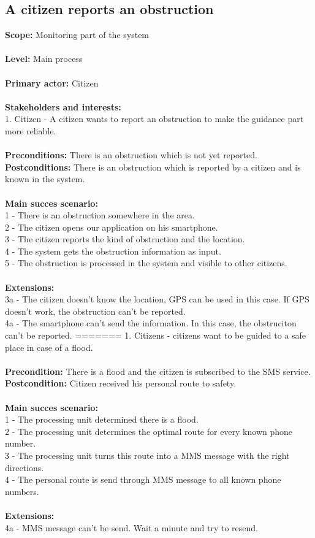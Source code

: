 \subsection{A citizen reports an obstruction}
\textbf{Scope:} Monitoring part of the system\\\\
\textbf{Level:} Main process\\\\
\textbf{Primary actor:} Citizen\\\\
\textbf{Stakeholders and interests:}\\
	1. Citizen - A citizen wants to report an obstruction to make the guidance part more reliable. \\\\
\textbf{Preconditions:} There is an obstruction which is not yet reported. \\
\textbf{Postconditions:} There is an obstruction which is reported by a citizen and is known in the system. \\\\
\textbf{Main succes scenario:} \\
1 - There is an obstruction somewhere in the area. \\
2 - The citizen opens our application on his smartphone. \\
3 - The citizen reports the kind of obstruction and the location. \\
4 - The system gets the obstruction information as input. \\
5 - The obstruction is processed in the system and visible to other citizens. \\\\
\textbf{Extensions:} \\
3a - The citizen doesn't know the location, GPS can be used in this case. If GPS doesn't work, the obstruction can't be reported. \\
4a - The smartphone can't send the information. In this case, the obstruciton can't be reported. 
=======
	1. Citizens - citizens want to be guided to a safe place in case of a flood. \\\\
\textbf{Precondition:} There is a flood and the citizen is subscribed to the SMS service. \\
\textbf{Postcondition:} Citizen received his personal route to safety. \\\\
\textbf{Main succes scenario:} \\
1 - The processing unit determined there is a flood.\\
2 - The processing unit determines the optimal route for every known phone number.\\
3 - The processing unit turns this route into a MMS message with the right directions.\\
4 - The personal route is send through MMS message to all known phone numbers.\\\\
\textbf{Extensions:} \\
4a - MMS message can't be send. Wait a minute and try to resend.\\

